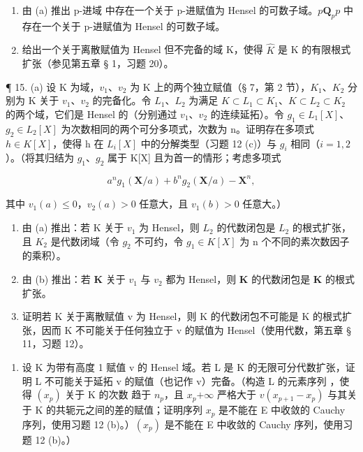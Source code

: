 \begin{enumerate}
\def\labelenumi{(\alph{enumi})}
\setcounter{enumi}{1}
\item
  由 (a) 推出 p-进域  中存在一个关于 p-进赋值为 Hensel 的可数子域。\(p\)\(\mathbf{Q}_p\)\(p\) 中存在一个关于 p-进赋值为 Hensel 的可数子域。
\item
  给出一个关于离散赋值为 Hensel 但不完备的域 K，使得 \(\hat{K}\) 是 K 的有限根式扩张（参见第五章 § 1，习题 20）。
\end{enumerate}

¶ 15. (a) 设 K 为域，\(v_1\)、\(v_2\) 为 K 上的两个独立赋值（§ 7，第 2 节），\(K_1\)、\(K_2\) 分别为 K 关于 \(v_1\)、\(v_2\) 的完备化。令 \(L_1\)、\(L_2\) 为满足 \(K \subset L_1 \subset K_1\)、\(K \subset L_2 \subset K_2\) 的两个域，它们是 Hensel 的（分别通过 \(v_1\)、\(v_2\) 的连续延拓）。令 \(g_1 \in L_1[X]\)、\(g_2 \in L_2[X]\) 为次数相同的两个可分多项式，次数为 n。证明存在多项式 \(h \in K[X]\)，使得 h 在 \(L_i[X]\) 中的分解类型（习题 12 (c)）与 \(g_i\) 相同（\(i = 1, 2\)）。（将其归结为 \(g_1\)、\(g_2\) 属于 K{[}X{]} 且为首一的情形；考虑多项式

\[
a ^ {n} g _ {1} (\mathbf {X} / a) + b ^ {n} g _ {2} (\mathbf {X} / a) - \mathbf {X} ^ {n},
\]

其中 \(v_{1}(a) \leqslant 0\)，\(v_{2}(a) > 0\) 任意大，且 \(v_{1}(b) > 0\) 任意大。）

\begin{enumerate}
\def\labelenumi{(\alph{enumi})}
\setcounter{enumi}{1}
\item
  由 (a) 推出：若 K 关于 \(v_{1}\) 为 Hensel，则 \(L_{2}\) 的代数闭包是 \(L_{2}\) 的根式扩张，且 \(K_{2}\) 是代数闭域（令 \(g_{2}\) 不可约，令 \(g_{1} \in K[X]\) 为 n 个不同的素次数因子的乘积）。
\item
  由 (b) 推出：若 \(\mathbf{K}\) 关于 \(v_{1}\) 与 \(v_{2}\) 都为 Hensel，则 \(\mathbf{K}\) 的代数闭包是 \(\mathbf{K}\) 的根式扩张。
\item
  证明若 K 关于离散赋值 v 为 Hensel，则 K 的代数闭包不可能是 K 的根式扩张，因而 K 不可能关于任何独立于 v 的赋值为 Hensel（使用代数，第五章 § 11，习题 12）。
\end{enumerate}

\begin{enumerate}
\def\labelenumi{\arabic{enumi}.}
\setcounter{enumi}{15}
\tightlist
\item
  设 K 为带有高度 1 赋值 v 的 Hensel 域。若 L 是 K 的无限可分代数扩张，证明 L 不可能关于延拓 v 的赋值（也记作 v）完备。（构造 L 的元素序列 ，使得 \((x_{p})\) 关于 K 的次数  趋于 \(n_{p}\)，且 \(x_{p}\)\(+\infty\) 严格大于 \(v(x_{p+1}-x_{p})\) 与其关于 K 的共轭元之间的差的赋值；证明序列 \(x_{p}\) 是不能在 E 中收敛的 Cauchy 序列，使用习题 12 (b)。）\((x_{p})\) 是不能在 E 中收敛的 Cauchy 序列，使用习题 12 (b)。）
\end{enumerate}

